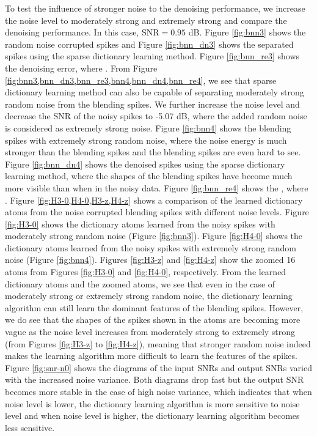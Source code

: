 To test the influence of stronger noise to the denoising performance, we increase the noise level to moderately strong and extremely strong and compare the denoising performance.  In this case, $\text{SNR}=0.95$ dB. Figure \ref{fig:bnn3} shows the random noise corrupted spikes and Figure \ref{fig:bnn_dn3} shows the separated spikes using the sparse dictionary learning method. Figure \ref{fig:bnn_re3} shows the denoising error, where . From Figure \ref{fig:bnn3,bnn_dn3,bnn_re3,bnn4,bnn_dn4,bnn_re4}, we see that sparse dictionary learning method can also be capable of separating moderately strong random noise from the blending spikes.  We further increase the noise level and decrease the SNR of the noisy spikes to -5.07 dB, where the added random noise is considered as extremely strong noise. Figure \ref{fig:bnn4} shows the blending spikes with extremely strong random noise, where the noise energy is much stronger than the blending spikes and the blending spikes are even hard to see. Figure \ref{fig:bnn_dn4} shows the denoised spikes using the sparse dictionary learning method, where the shapes of the blending spikes have become much more visible than when in the noisy data. Figure \ref{fig:bnn_re4} shows the , where . Figure \ref{fig:H3-0,H4-0,H3-z,H4-z} shows a comparison of the learned dictionary atoms from the noise corrupted blending spikes with different noise levels. Figure \ref{fig:H3-0} shows the dictionary atoms learned from the noisy spikes with moderately strong random noise (Figure \ref{fig:bnn3}). Figure \ref{fig:H4-0} shows the dictionary atoms learned from the noisy spikes with extremely strong random noise (Figure \ref{fig:bnn4}). Figures \ref{fig:H3-z} and \ref{fig:H4-z} show the zoomed 16 atoms from Figures \ref{fig:H3-0} and \ref{fig:H4-0}, respectively. From the learned dictionary atoms and the zoomed atoms, we see that even in the case of moderately strong or extremely strong random noise, the dictionary learning algorithm can still learn the dominant features of the blending spikes. However, we do see that the shapes of the spikes shown in the atoms are becoming more vague as the noise level increases from moderately strong to extremely strong (from Figures \ref{fig:H3-z} to \ref{fig:H4-z}), meaning that stronger random noise indeed makes the learning algorithm more difficult to learn the features of the spikes. Figure \ref{fig:snr-n0} shows the diagrams of the input SNRs and output SNRs varied with the increased noise variance. Both diagrams drop fast  but the output SNR becomes more stable in the case of high noise variance, which indicates that when noise level is lower, the dictionary learning algorithm is more sensitive to noise level and when noise level is higher, the dictionary learning algorithm becomes less sensitive.

